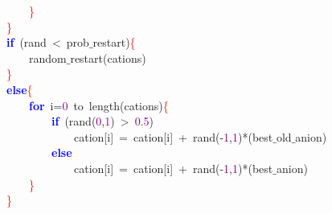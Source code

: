 \mbox{}\ \ \ \ \ \ \ \ \textcolor{Red}{\}} \\
\mbox{}\ \ \ \ \textcolor{Red}{\}} \\
\mbox{}\ \ \ \ \textbf{\textcolor{Blue}{if}}\ \textcolor{BrickRed}{(}rand\ \textcolor{BrickRed}{\textless{}}\ prob$\_$restart\textcolor{BrickRed}{)}\textcolor{Red}{\{} \\
\mbox{}\ \ \ \ \ \ \ \ random$\_$restart\textcolor{BrickRed}{(}cations\textcolor{BrickRed}{)} \\
\mbox{}\ \ \ \ \textcolor{Red}{\}} \\
\mbox{}\ \ \ \ \textbf{\textcolor{Blue}{else}}\textcolor{Red}{\{} \\
\mbox{}\ \ \ \ \ \ \ \ \textbf{\textcolor{Blue}{for}}\ i\textcolor{BrickRed}{=}\textcolor{Purple}{0}\ to\ length\textcolor{BrickRed}{(}cations\textcolor{BrickRed}{)}\textcolor{Red}{\{} \\
\mbox{}\ \ \ \ \ \ \ \ \ \ \ \ \textbf{\textcolor{Blue}{if}}\ \textcolor{BrickRed}{(}rand\textcolor{BrickRed}{(}\textcolor{Purple}{0}\textcolor{BrickRed}{,}\textcolor{Purple}{1}\textcolor{BrickRed}{)}\ \textcolor{BrickRed}{\textgreater{}}\ \textcolor{Purple}{0.5}\textcolor{BrickRed}{)} \\
\mbox{}\ \ \ \ \ \ \ \ \ \ \ \ \ \ \ \ cation\textcolor{BrickRed}{[}i\textcolor{BrickRed}{]}\ \textcolor{BrickRed}{=}\ cation\textcolor{BrickRed}{[}i\textcolor{BrickRed}{]}\ \textcolor{BrickRed}{+}\ rand\textcolor{BrickRed}{(-}\textcolor{Purple}{1}\textcolor{BrickRed}{,}\textcolor{Purple}{1}\textcolor{BrickRed}{)*(}best$\_$old$\_$anion\textcolor{BrickRed}{)} \\
\mbox{}\ \ \ \ \ \ \ \ \ \ \ \ \textbf{\textcolor{Blue}{else}} \\
\mbox{}\ \ \ \ \ \ \ \ \ \ \ \ \ \ \ \ cation\textcolor{BrickRed}{[}i\textcolor{BrickRed}{]}\ \textcolor{BrickRed}{=}\ cation\textcolor{BrickRed}{[}i\textcolor{BrickRed}{]}\ \textcolor{BrickRed}{+}\ rand\textcolor{BrickRed}{(-}\textcolor{Purple}{1}\textcolor{BrickRed}{,}\textcolor{Purple}{1}\textcolor{BrickRed}{)*(}best$\_$anion\textcolor{BrickRed}{)} \\
\mbox{}\ \ \ \ \ \ \ \ \textcolor{Red}{\}} \\
\mbox{}\ \ \ \ \textcolor{Red}{\}} \\
\mbox{}
